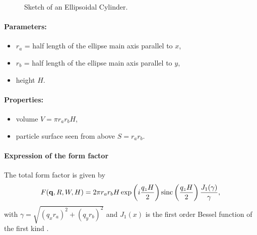\begin{figure}[ht]
\hfill
{}
\hfill
{}
\hfill
\caption{Sketch of an Ellipsoidal Cylinder.}
\label{fig:ellipscylinder}
\end{figure}

\paragraph{Parameters:}
\begin{itemize}
\item $r_a$ = half length of the ellipse main axis parallel to $x$,
\item$r_b$ = half length of the ellipse main axis parallel to $y$, 
\item height $H$.
\end{itemize}

\paragraph{Properties:}
\begin{itemize}
\item volume $V = \pi r_a r_bH$,
\item particle surface seen from above $S = r_a r_b$.
\end{itemize}

\paragraph{Expression of the form factor}
The total form factor is given by 
\begin{equation*}
F(\mathbf{q},R,W,H) = 2\pi r_a r_b H \exp\left(i\frac{q_z
  H}{2}\right)\operatorname{sinc}\left(\frac{q_z H}{2}\right) \frac{J_1(\gamma)}{\gamma},
\end{equation*}
with $\gamma=\sqrt{(q_x r_a)^2+(q_y r_b)^2}$ and $J_1(x)$ is the first order
Bessel function of the first kind \cite{AbSt64}.

